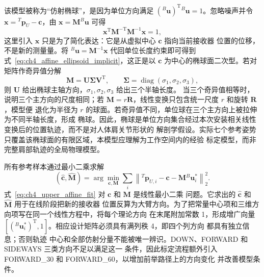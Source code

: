 该模型被称为“仿射椭球”，是因为单位方向满足
$({}^{B}\boldsymbol u)^{\mathrm T}{}^{B}\boldsymbol u=1$。忽略噪声并令
$\boldsymbol x={}^{T}\boldsymbol p_U-\boldsymbol c$，由
$\boldsymbol x=\boldsymbol M{}^{B}\boldsymbol u$ 可得
\begin{equation}
  \boldsymbol x^{\mathrm T}\boldsymbol M^{-\mathrm T}
  \boldsymbol M^{-1}\boldsymbol x=1,
  \label{eq:ch4_affine_ellipsoid_implicit}
\end{equation}
这里引入 $\boldsymbol x$ 只是为了简化表达：它是从虚拟中心 $\boldsymbol c$ 指向当前接收器
位置的位移，不是新的测量量。将 ${}^{B}\boldsymbol u=\boldsymbol M^{-1}\boldsymbol x$
代回单位长度约束即可得到式~\eqref{eq:ch4_affine_ellipsoid_implicit}，这正是以
$\boldsymbol c$ 为中心的椭球面二次型。若对矩阵作奇异值分解
\begin{equation}
  \boldsymbol M=\boldsymbol U\boldsymbol\Sigma\boldsymbol V^{\mathrm T},
  \qquad
  \boldsymbol\Sigma=\operatorname{diag}(\sigma_1,\sigma_2,\sigma_3),
  \label{eq:ch4_affine_matrix_svd}
\end{equation}
则 $\boldsymbol U$ 给出椭球主轴方向，$\sigma_1,\sigma_2,\sigma_3$ 给出三个半轴长度。
当三个奇异值相等时，说明三个主方向的尺度相同；若
$\boldsymbol M=r\boldsymbol R$，线性变换只包含统一尺度 $r$ 和旋转 $\boldsymbol R$，模型便
退化为半径为 $r$ 的球面。若奇异值不同，单位球在三个主方向上被拉伸为不同半轴长度，形成
椭球。因此，椭球是单位方向集合经过本次安装相关线性变换后的位置轨迹，而不是对人体肩关节形状的
解剖学假设。实际七个参考姿势只覆盖该椭球面的有限区域，本模型应理解为工作空间内的经验
标定模型，而非完整肩部轨迹的全局物理模型。

所有参考样本通过最小二乘求解
\begin{equation}
  (\hat{\boldsymbol c},\hat{\boldsymbol M})=
  \arg\min_{\boldsymbol c,\boldsymbol M}
  \sum_i\left\|
  {}^{T}\boldsymbol p_{U,i}-\boldsymbol c-
  \boldsymbol M{}^{B}\boldsymbol u_i^{*}
  \right\|_2^2.
  \label{eq:ch4_upper_affine_fit}
\end{equation}
式~\eqref{eq:ch4_upper_affine_fit} 对 $\boldsymbol c$ 和 $\boldsymbol M$ 是线性最小二乘
问题。它求出的 $\hat{\boldsymbol c}$ 和 $\hat{\boldsymbol M}$ 用于在线阶段把新的接收器
位置反算为大臂方向。为了把常量中心项和三维方向项写在同一个线性方程中，将每个理论方向
在末尾附加常数 1，形成增广向量
$[({}^{B}\boldsymbol u_i^{*})^{\mathrm T},1]$。相应设计矩阵必须具有满列秩 4，即四个列方向
都具有独立信息；否则轨迹
中心和全部仿射分量不能被唯一辨识。DOWN、FORWARD 和 SIDEWAYS 三类方向不足以满足这一
条件，因此标定流程额外引入 FORWARD\_30 和 FORWARD\_60，以增加前举路径上的方向变化
并改善模型条件。

